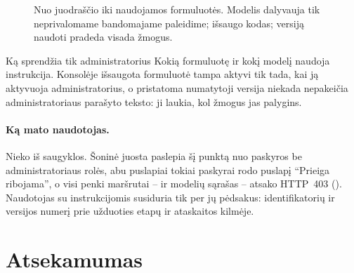 \begin{figure}[H]
\centering
{}
\actorlegend
\caption{Nuo juodraščio iki naudojamos formuluotės. Modelis dalyvauja tik neprivalomame
bandomajame paleidime; išsaugo kodas; versiją naudoti pradeda visada žmogus.}\label{fig:prompts:edit}
\end{figure}

\begin{humanbox}{Ką sprendžia tik administratorius}
Kokią formuluotę ir kokį modelį naudoja instrukcija. Konsolėje išsaugota formuluotė tampa aktyvi
tik tada, kai ją aktyvuoja administratorius, o pristatoma numatytoji versija niekada nepakeičia
administratoriaus parašyto teksto: ji laukia, kol žmogus jas palygins.
\end{humanbox}

\paragraph{Ką mato naudotojas.} Nieko iš saugyklos. Šoninė juosta paslepia šį punktą nuo
paskyros be administratoriaus rolės, abu puslapiai tokiai paskyrai rodo puslapį
\enquote{Prieiga ribojama}, o visi penki maršrutai -- ir modelių sąrašas -- atsako HTTP~403
 (). Naudotojas su instrukcijomis susiduria tik per
jų pėdsakus: identifikatorių ir versijos numerį prie užduoties etapų ir ataskaitos kilmėje.


\section{Atsekamumas}\label{sec:prompts:trace}

